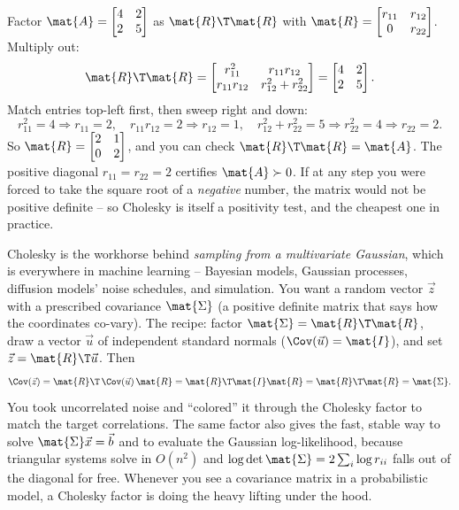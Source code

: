\begin{example}
\label{ch27:ex-cholesky}
Factor $\mat{A} = \begin{bmatrix} 4 & 2 \\ 2 & 5 \end{bmatrix}$ as $\mat{R}\T\mat{R}$ with
$\mat{R} = \begin{bmatrix} r_{11} & r_{12} \\ 0 & r_{22} \end{bmatrix}$. Multiply out:
\[
  \mat{R}\T\mat{R} =
  \begin{bmatrix} r_{11}^2 & r_{11}r_{12} \\ r_{11}r_{12} & r_{12}^2 + r_{22}^2 \end{bmatrix}
  = \begin{bmatrix} 4 & 2 \\ 2 & 5 \end{bmatrix}.
\]
Match entries top-left first, then sweep right and down:
\[
  r_{11}^2 = 4 \Rightarrow r_{11} = 2,\quad
  r_{11}r_{12} = 2 \Rightarrow r_{12} = 1,\quad
  r_{12}^2 + r_{22}^2 = 5 \Rightarrow r_{22}^2 = 4 \Rightarrow r_{22}=2.
\]
So $\mat{R} = \begin{bmatrix} 2 & 1 \\ 0 & 2 \end{bmatrix}$, and you can check
$\mat{R}\T\mat{R} = \mat{A}$. The positive diagonal $r_{11}=r_{22}=2$ certifies $\mat{A}\succ0$. If at
any step you were forced to take the square root of a \emph{negative} number, the matrix would not be
positive definite -- so Cholesky is itself a positivity test, and the cheapest one in practice.
\end{example}

\begin{applicationbox}
Cholesky is the workhorse behind \emph{sampling from a multivariate Gaussian}, which is everywhere in
machine learning -- Bayesian models, Gaussian processes, diffusion models' noise schedules, and
simulation. You want a random vector $\vec{z}$ with a prescribed covariance $\mat{\Sigma}$ (a
positive definite matrix that says how the coordinates co-vary). The recipe: factor
$\mat{\Sigma}=\mat{R}\T\mat{R}$, draw a vector $\vec{u}$ of independent standard normals
($\Cov(\vec{u})=\mat{I}$), and set $\vec{z} = \mat{R}\T\vec{u}$. Then
\[
  \Cov(\vec{z}) = \mat{R}\T\,\Cov(\vec{u})\,\mat{R} = \mat{R}\T\mat{I}\mat{R} = \mat{R}\T\mat{R}
  = \mat{\Sigma}.
\]
You took uncorrelated noise and ``colored'' it through the Cholesky factor to match the target
correlations. The same factor also gives the fast, stable way to solve $\mat{\Sigma}\vec{x}=\vec{b}$
and to evaluate the Gaussian log-likelihood, because triangular systems solve in $O(n^2)$ and
$\log\det\mat{\Sigma} = 2\sum_i \log r_{ii}$ falls out of the diagonal for free. Whenever you see a
covariance matrix in a probabilistic model, a Cholesky factor is doing the heavy lifting under the
hood.
\end{applicationbox}

